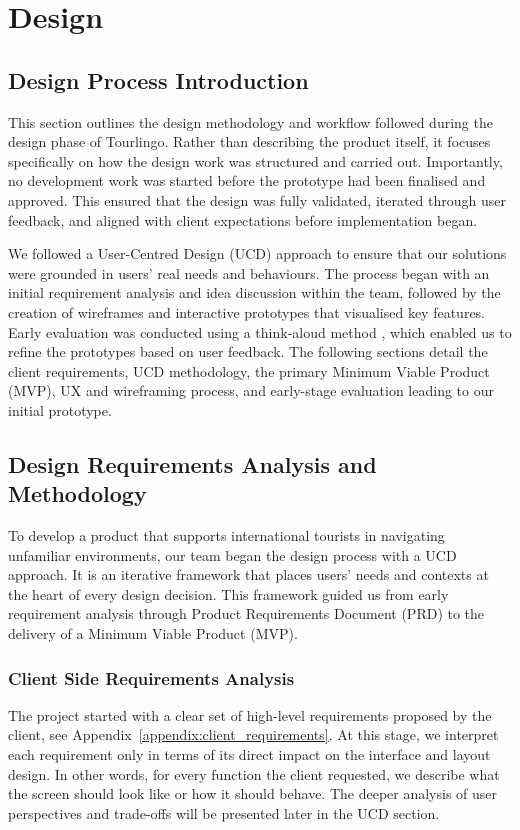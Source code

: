 \chapter{Design}

\section{Design Process Introduction}
This section outlines the design methodology and workflow followed during the design phase of Tourlingo. Rather than describing the product itself, it focuses specifically on how the design work was structured and carried out. Importantly, no development work was started before the prototype had been finalised and approved. This ensured that the design was fully validated, iterated through user feedback, and aligned with client expectations before implementation began.

We followed a User-Centred Design (UCD) approach \cite{ux_ucd_interaction} to ensure that our solutions were grounded in users' real needs and behaviours. The process began with an initial requirement analysis and idea discussion within the team, followed by the creation of wireframes and interactive prototypes that visualised key features. Early evaluation was conducted using a think-aloud method \cite{think_aloud_wiki}, which enabled us to refine the prototypes based on user feedback. The following sections detail the client requirements, UCD methodology, the primary Minimum Viable Product (MVP), UX and wireframing process, and early-stage evaluation leading to our initial prototype.

\section{Design Requirements Analysis and Methodology}
To develop a product that supports international tourists in navigating unfamiliar environments, our team began the design process with a UCD approach. It is an iterative framework that places users' needs and contexts at the heart of every design decision. This framework guided us from early requirement analysis through Product Requirements Document (PRD) to the delivery of a Minimum Viable Product (MVP).

\subsection{Client Side Requirements Analysis}
The project started with a clear set of high-level requirements proposed by the client, see Appendix~\ref{appendix:client_requirements}. At this stage, we interpret each requirement only in terms of its direct impact on the interface and layout design. In other words, for every function the client requested, we describe what the screen should look like or how it should behave. The deeper analysis of user perspectives and trade-offs will be presented later in the UCD section. 

